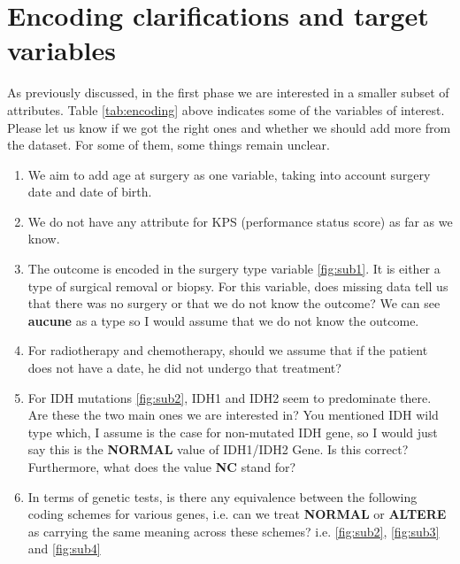 \documentclass[a4paper]{article}
\begin{document}
\section{Encoding clarifications and target variables}
As previously discussed, in the first phase we are interested in a smaller subset of attributes. Table \ref{tab:encoding} above indicates some of the variables of interest. Please let us know if we got the right ones and whether we should add more from the dataset. For some of them, some things remain unclear. \\
\begin{enumerate}
\item We aim to add age at surgery as one variable, taking into account surgery date and date of birth. 
\item We do not have any attribute for KPS (performance status score) as far as we know. 
\item The outcome is encoded in the surgery type variable \ref{fig:sub1}. It is either a type of surgical removal or biopsy. For this variable, does missing data tell us that there was no surgery or that we do not know the outcome?
We can see \textbf{aucune} as a type so I would assume that we do not know the outcome. 
\item For radiotherapy and chemotherapy, should we assume that if the patient does not have a date, he did not undergo that treatment? 
\item For IDH mutations \ref{fig:sub2}, IDH1 and IDH2 seem to predominate there. Are these the two main ones we are interested in? You mentioned IDH wild type which, I assume is the case for non-mutated IDH gene, so I would just say this is the \textbf{NORMAL} value of IDH1/IDH2 Gene. Is this correct? Furthermore, what does the value \textbf{NC} stand for?
\item In terms of genetic tests, is there any equivalence between the following coding schemes for various genes, i.e. can we treat \textbf{NORMAL} or \textbf{ALTERE} as carrying the same meaning across these schemes? i.e. \ref{fig:sub2}, \ref{fig:sub3} and \ref{fig:sub4}
\end{enumerate}
\end{document}
